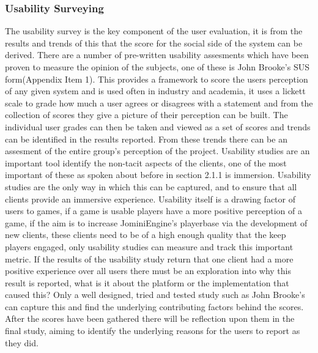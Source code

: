 \documentclass{article}
\begin{document}
	\subsubsection{Usability Surveying}
	The usability survey is the key component of the user evaluation, it is from the results and trends of this that the score for the social side of the system can be derived. There are a number of pre-written usability assesments which have been proven to measure the opinion of the subjects, one of these is John Brooke's SUS form\cite{Brooke96sus:a}(Appendix Item 1). This provides a framework to score the users perception of any given system and is used often in industry and academia, it uses a lickett scale to grade how much a user agrees or disagrees with a statement and from the collection of scores they give a picture of their perception can be built. The individual user grades can then be taken and viewed as a set of scores and trends can be identified in the results reported. From these trends there can be an assesment of the entire group's perception of the project. Usability studies are an important tool identify the non-tacit aspects of the clients, one of the most important of these as spoken about before in section 2.1.1 is immersion. Usability studies are the only way in which this can be captured, and to ensure that all clients provide an immersive experience. Usability itself is a drawing factor of users to games, if a game is usable players have a more positive perception of a game\cite{Christou:2012:EPP:2367616.2367630}, if the aim is to increase JominiEngine's playerbase via the development of new clients, these clients need to be of a high enough quality that the keep players engaged, only usability studies can measure and track this important metric. If the results of the usability study return that one client had a more positive experience over all users there must be an exploration into why this result is reported, what is it about the platform or the implementation that caused this? Only a well designed, tried and tested study such as John Brooke's can capture this and find the underlying contributing factors behind the scores. After the scores have been gathered there will be reflection upon them in the final study, aiming to identify the underlying reasons for the users to report as they did.
\end{document}
